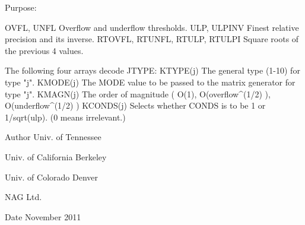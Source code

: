 \begin{DoxyParagraph}{Purpose\+: }
\begin{DoxyVerb}
     OVFL, UNFL      Overflow and underflow thresholds.
     ULP, ULPINV     Finest relative precision and its inverse.
     RTOVFL, RTUNFL,
     RTULP, RTULPI   Square roots of the previous 4 values.

             The following four arrays decode JTYPE:
     KTYPE(j)        The general type (1-10) for type "j".
     KMODE(j)        The MODE value to be passed to the matrix
                     generator for type "j".
     KMAGN(j)        The order of magnitude ( O(1),
                     O(overflow^(1/2) ), O(underflow^(1/2) )
     KCONDS(j)       Selects whether CONDS is to be 1 or
                     1/sqrt(ulp).  (0 means irrelevant.)\end{DoxyVerb}
 
\end{DoxyParagraph}
\begin{DoxyAuthor}{Author}
Univ. of Tennessee 

Univ. of California Berkeley 

Univ. of Colorado Denver 

N\+A\+G Ltd. 
\end{DoxyAuthor}
\begin{DoxyDate}{Date}
November 2011 
\end{DoxyDate}
\hypertarget{group__complex__eig_ga525d1a2df6511f9a488f0dd914a45baa}{}

